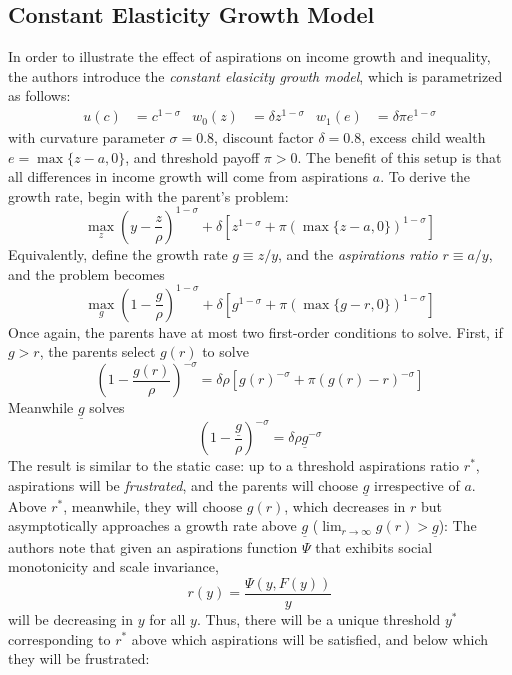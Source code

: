 \documentclass[11pt]{article}
\begin{document}
    \subsection{Constant Elasticity Growth Model}
    In order to illustrate the effect of aspirations on income growth and inequality, the authors introduce the \textit{constant elasicity growth model}, which is parametrized as follows:
    \begin{align*}
        u(c) &= c^{1 - \sigma} & w_0(z) &= \delta z^{1 - \sigma} & w_1(e) &= \delta \pi e^{1 - \sigma}
    \end{align*}
    with curvature parameter \( \sigma = 0.8 \), discount factor \( \delta = 0.8 \), excess child wealth \( e = \max\{z - a, 0\} \), and threshold payoff \( \pi > 0 \). The benefit of this setup is that all differences in income growth will come from aspirations \( a \). To derive the growth rate, begin with the parent's problem:
    \[\max_z \left(y - \frac{z}{\rho}\right)^{1 - \sigma} + \delta\left[z^{1 - \sigma} + \pi \left(\max\{z - a, 0\}\right)^{1 - \sigma}\right]\]
    Equivalently, define the growth rate \( g\equiv z / y \), and the \textit{aspirations ratio} \( r\equiv a / y \), and the problem becomes 
    \[\max_g \left(1 - \frac{g}{\rho}\right)^{1 - \sigma} + \delta\left[g^{1 - \sigma} + \pi \left(\max\{g - r, 0\}\right)^{1 - \sigma}\right]\]
    Once again, the parents have at most two first-order conditions to solve. First, if \( g > r \), the parents select \( g(r) \) to solve 
    \[\left(1 - \frac{g(r)}{\rho}\right)^{- \sigma} = \delta\rho\left[g(r)^{- \sigma} + \pi \left(g(r) - r\right)^{-\sigma}\right]\]
    Meanwhile \( \underline{g} \) solves
    \[\left(1 - \frac{\underline{g}}{\rho}\right)^{-\sigma} = \delta\rho \underline{g}^{-\sigma} \]
    The result is similar to the static case: up to a threshold aspirations ratio \( r^* \), aspirations will be \textit{frustrated}, and the parents will choose \( \underline{g} \) irrespective of \( a \). Above \( r^* \), meanwhile, they will choose \( g(r) \), which decreases in \( r \) but asymptotically approaches a growth rate above \( \underline{g} \) (\( \lim_{r\to\infty} g(r) > \underline{g} \)): 
    The authors note that given an aspirations function \( \Psi \) that exhibits social monotonicity and scale invariance, 
    \[r(y) = \frac{\Psi(y, F(y))}{y}\]
    will be decreasing in \( y \) for all \( y \). Thus, there will be a unique threshold \( y^* \) corresponding to \( r^* \) above which aspirations will be satisfied, and below which they will be frustrated:
\end{document}
